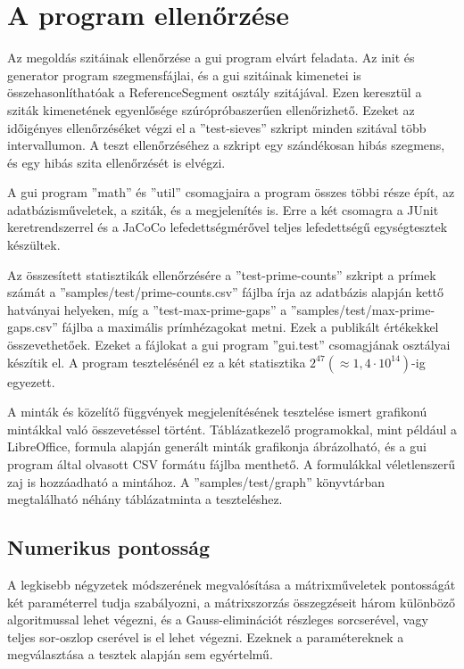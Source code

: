 \section{A program ellenőrzése}

Az megoldás szitáinak ellenőrzése a gui program elvárt feladata.
Az init és generator program szegmensfájlai, és a gui szitáinak kimenetei is összehasonlíthatóak a ReferenceSegment osztály szitájával.
Ezen keresztül a sziták kimenetének egyenlősége szúrópróbaszerűen ellenőrizhető.
Ezeket az időigényes ellenőrzéséket végzi el a ''test-sieves'' szkript minden szitával több intervallumon.
A teszt ellenőrzéséhez a szkript egy szándékosan hibás szegmens, és egy hibás szita ellenőrzését is elvégzi.

A gui program ''math'' és ''util'' csomagjaira a program összes többi része épít, az adatbázisműveletek, a sziták, és a megjelenítés is. Erre a két csomagra a JUnit keretrendszerrel és a JaCoCo lefedettségmérővel teljes lefedettségű egységtesztek készültek.

Az összesített statisztikák ellenőrzésére a ''test-prime-counts'' szkript a prímek számát a ''samples/test/prime-counts.csv'' fájlba írja az adatbázis alapján kettő hatványai helyeken, míg a ''test-max-prime-gaps'' a ''samples/test/max-prime-gaps.csv'' fájlba a maximális prímhézagokat metni.
Ezek a publikált értékekkel\cite{gaps}\cite{pi} összevethetőek. Ezeket a fájlokat a gui program ''gui.test'' csomagjának osztályai készítik el. A program tesztelésénél ez a két statisztika $2^{47}(\approx1,4\cdot10^{14})$-ig egyezett.

A minták és közelítő függvények megjelenítésének tesztelése ismert grafikonú mintákkal való összevetéssel történt.
Táblázatkezelő programokkal, mint például a LibreOffice, formula alapján generált minták grafikonja ábrázolható, és a gui program által olvasott CSV formátu fájlba menthető.
A formulákkal véletlenszerű zaj is hozzáadható a mintához.
A ''samples/test/graph'' könyvtárban megtalálható néhány táblázatminta a teszteléshez.

\subsection{Numerikus pontosság}

A legkisebb négyzetek módszerének megvalósítása a mátrixműveletek pontosságát két paraméterrel tudja szabályozni, a mátrixszorzás összegzéseit három különböző algoritmussal lehet végezni, és a Gauss-eliminációt részleges sorcserével, vagy teljes sor-oszlop cserével is el lehet végezni.
Ezeknek a paramétereknek a megválasztása a tesztek alapján sem egyértelmű.

